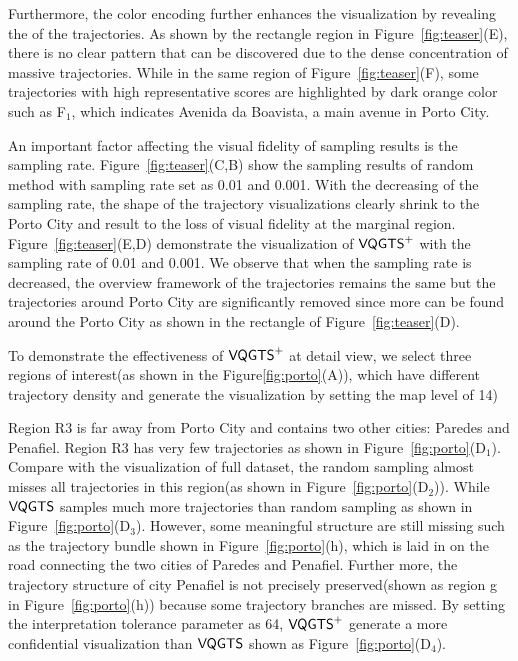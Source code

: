 Furthermore, the color encoding further enhances the visualization by revealing the  of the trajectories.
As shown by the rectangle region in Figure~\ref{fig:teaser}(E), there is no clear pattern that can be discovered due to the dense concentration of massive trajectories. While in the same region of Figure~\ref{fig:teaser}(F), some trajectories with high representative scores are highlighted by dark orange color such as F$_1$, which indicates Avenida da Boavista, a main avenue in Porto City. 
 
 
An important factor affecting the visual fidelity of sampling results is the sampling rate. Figure~\ref{fig:teaser}(C,B) show the sampling results of random method with sampling rate set as 0.01 and 0.001. With the decreasing of the sampling rate, the shape of the trajectory visualizations clearly shrink to the Porto City and result to the loss of visual fidelity at the marginal region. Figure~\ref{fig:teaser}(E,D) demonstrate the visualization of $\mathsf{VQGTS}^{+}$ with the sampling rate of 0.01 and 0.001. We observe that when the sampling rate is decreased, the overview framework of the trajectories remains the same but the trajectories around Porto City are significantly removed since more  can be found around the Porto City as shown in the rectangle of Figure~\ref{fig:teaser}(D). 

To demonstrate the effectiveness of $\mathsf{VQGTS}^{+}$ at detail view, we select three regions of interest(as shown in the Figure\ref{fig:porto}(A)), which have different trajectory density and generate the visualization by setting the map level of 14) 
   
Region R3 is far away from Porto City and contains two other cities: Paredes and Penafiel. Region R3 has very few trajectories as shown in Figure~\ref{fig:porto}(D$_1$).  Compare with the visualization of full dataset, the random sampling almost misses all trajectories in this region(as shown in Figure~\ref{fig:porto}(D$_2$)). While $\mathsf{VQGTS}$ samples much more trajectories than random sampling as shown in Figure~\ref{fig:porto}(D$_3$). However, some meaningful structure are still missing such as the trajectory bundle shown in Figure~\ref{fig:porto}(h), which is laid in on the road  connecting the two cities of Paredes and Penafiel. Further more, the trajectory structure of city Penafiel is not precisely preserved(shown as region g in Figure~\ref{fig:porto}(h)) because some  trajectory branches are missed.  
By setting the interpretation tolerance parameter as 64, $\mathsf{VQGTS}^{+}$ generate a more confidential visualization than $\mathsf{VQGTS}$ shown as Figure~\ref{fig:porto}(D$_4$). 

